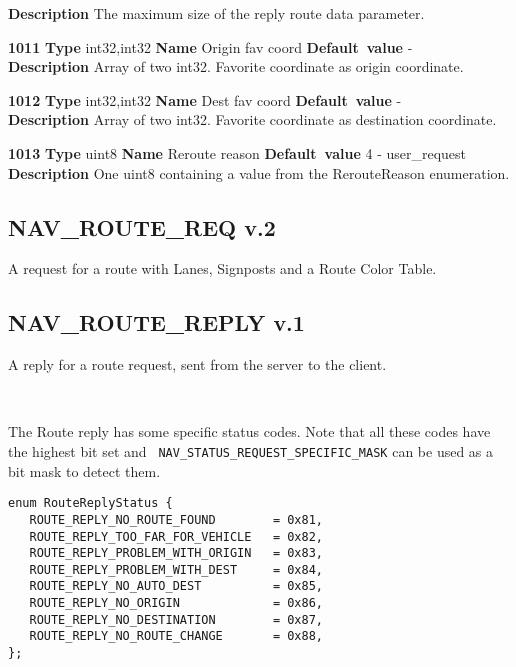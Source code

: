 \documentclass[a4paper]{article}
\begin{document}
\begin{list}{\textbf{ParamID}}{}
  \label{Max route size}
  \textbf{Description} The maximum size of the reply route data parameter.
\item \textbf{1011} \textbf{Type} int32,int32 \textbf{Name} Origin fav coord
                 \textbf{Default~value} - \\
  \label{Origin fav coord}
  \textbf{Description} Array of two int32. Favorite coordinate as origin
  coordinate.
\item \textbf{1012} \textbf{Type} int32,int32 \textbf{Name} Dest fav coord
                 \textbf{Default~value} - \\
  \label{Dest fav coord}
  \textbf{Description} Array of two int32. Favorite coordinate as destination
  coordinate.

\item \textbf{1013} \textbf{Type} uint8 \textbf{Name} Reroute reason
                 \textbf{Default~value} 4 - user\_request \\
  \label{Reroute reason}
  \textbf{Description} One uint8 containing a value from the
  RerouteReason enumeration.

\end{list}

\subsection{NAV\_ROUTE\_REQ v.2}

A request for a route with Lanes, Signposts and a Route Color Table.


\subsection{NAV\_ROUTE\_REPLY v.1}

A reply for a route request, sent from the server
to the client.

~

The Route reply has some specific status codes. Note that all these
codes have the highest bit set and {\tt
  NAV\_STATUS\_REQUEST\_SPECIFIC\_MASK} can be used as a bit mask to
detect them.
\begin{verbatim}
enum RouteReplyStatus {
   ROUTE_REPLY_NO_ROUTE_FOUND        = 0x81,
   ROUTE_REPLY_TOO_FAR_FOR_VEHICLE   = 0x82,
   ROUTE_REPLY_PROBLEM_WITH_ORIGIN   = 0x83,
   ROUTE_REPLY_PROBLEM_WITH_DEST     = 0x84,
   ROUTE_REPLY_NO_AUTO_DEST          = 0x85,
   ROUTE_REPLY_NO_ORIGIN             = 0x86,
   ROUTE_REPLY_NO_DESTINATION        = 0x87,
   ROUTE_REPLY_NO_ROUTE_CHANGE       = 0x88,
};
\end{verbatim}
\end{document}
